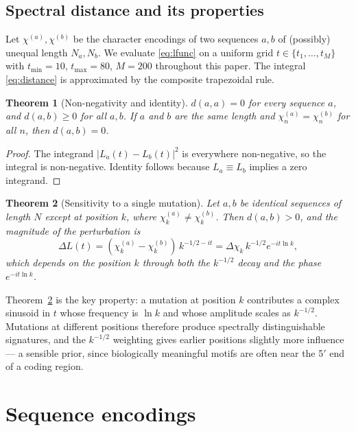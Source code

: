 \documentclass[12pt,a4paper]{article}
\newtheorem{theorem}{Theorem}
\begin{document}
\subsection{Spectral distance and its properties}
\label{sec:properties}

Let $\chi^{(a)}, \chi^{(b)}$ be the character encodings of two sequences
$a, b$ of (possibly) unequal length $N_a, N_b$. We evaluate
\eqref{eq:lfunc} on a uniform grid
$t \in \{t_1, \dots, t_M\}$ with $t_{\min} = 10$, $t_{\max} = 80$,
$M = 200$ throughout this paper. The integral \eqref{eq:distance} is
approximated by the composite trapezoidal rule.

\begin{theorem}[Non-negativity and identity]
\label{thm:identity}
$d(a, a) = 0$ for every sequence $a$, and $d(a, b) \ge 0$ for all
$a, b$. If $a$ and $b$ are the same length and $\chi^{(a)}_n =
\chi^{(b)}_n$ for all $n$, then $d(a, b) = 0$.
\end{theorem}

\begin{proof}
The integrand $|L_a(t) - L_b(t)|^2$ is everywhere non-negative, so the
integral is non-negative. Identity follows because $L_a \equiv L_b$
implies a zero integrand.
\end{proof}

\begin{theorem}[Sensitivity to a single mutation]
\label{thm:snp}
Let $a, b$ be identical sequences of length $N$ except at position $k$,
where $\chi^{(a)}_k \neq \chi^{(b)}_k$. Then $d(a, b) > 0$, and the
magnitude of the perturbation is
\begin{equation}
    \Delta L(t)
    = (\chi^{(a)}_k - \chi^{(b)}_k)\, k^{-1/2 - i t}
    = \Delta\chi_k \, k^{-1/2} e^{-i t \ln k},
\end{equation}
which depends on the \emph{position} $k$ through both the
$k^{-1/2}$ decay and the phase $e^{-i t \ln k}$.
\end{theorem}

Theorem~\ref{thm:snp} is the key property: a mutation at position $k$
contributes a complex sinusoid in $t$ whose frequency is $\ln k$ and
whose amplitude scales as $k^{-1/2}$. Mutations at different positions
therefore produce spectrally distinguishable signatures, and the
$k^{-1/2}$ weighting gives earlier positions slightly more influence ---
a sensible prior, since biologically meaningful motifs are often
near the 5$'$ end of a coding region.

\section{Sequence encodings}
\label{sec:encoding}
\end{document}
